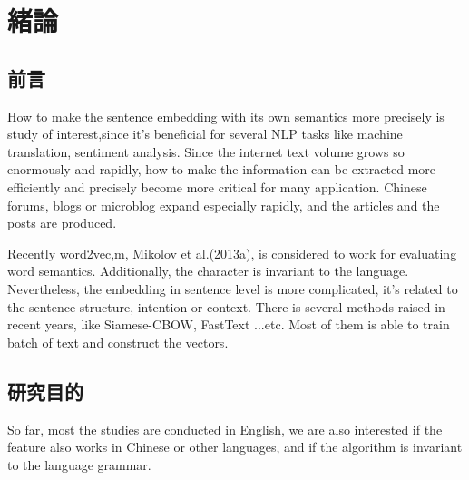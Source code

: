 \chapter{緒論}
\setlength{\baselineskip}{1.5em}
\setlength{\parindent}{2em}
\setlength{\parskip}{1em}

\section{前言}

How to make the sentence embedding with its own semantics more precisely is study of interest,since it's beneficial for several NLP tasks like machine translation, sentiment analysis. Since the internet text volume grows so enormously and rapidly, how to make the information can be extracted more efficiently and precisely become more critical for many application. Chinese forums, blogs or microblog expand especially rapidly, and the articles and the posts are produced.

Recently word2vec,m, Mikolov et al.(2013a), is considered to work for evaluating word semantics.  Additionally, the character is invariant to the language. Nevertheless, the embedding in sentence level is more complicated, it's related to the sentence structure,  intention or context. There is several methods raised in recent years, like Siamese-CBOW, FastText ...etc. Most of them is able to train batch of text and construct the vectors.

\section{研究目的}

So far, most the studies are conducted in English, we are also interested if the feature also works in Chinese or other languages, and if the algorithm is invariant to the language grammar.